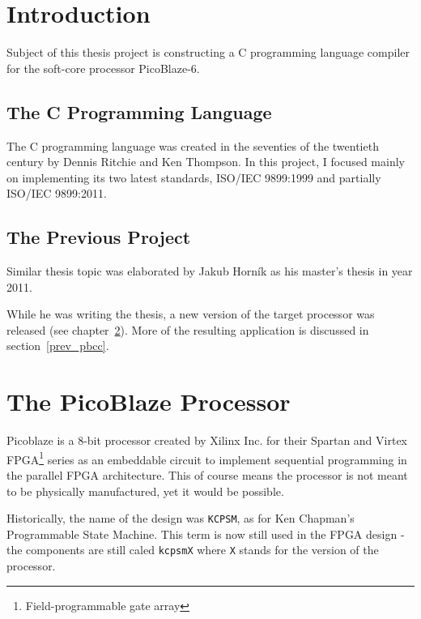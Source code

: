 
\chapter{Introduction}\label{introduction}

Subject of this thesis project is constructing a C programming language compiler for the soft-core processor PicoBlaze-6.

    \section{The C Programming Language}


    The C programming language was created in the seventies %
    of the twentieth century by Dennis Ritchie and Ken Thompson. In this project, I focused mainly on implementing its two latest standards, ISO/IEC 9899:1999 and partially ISO/IEC 9899:2011.

    \section{The Previous Project}
    Similar thesis topic was elaborated by Jakub Horník as his %
    master's thesis in year 2011.

    While he was writing the thesis, a new version of the target processor was released (see chapter~\ref{processor}). More of the resulting application is discussed in section~\ref{prev_pbcc}.

\chapter{The PicoBlaze Processor}\label{processor}

Picoblaze is a 8-bit processor created by Xilinx Inc. for their Spartan and Virtex FPGA\footnote{Field-programmable gate array} series as an embeddable circuit to implement sequential programming in the parallel FPGA architecture. This of course means the processor is not meant to be physically manufactured, yet it would be possible.

Historically, the name of the design was \texttt{KCPSM}, as for Ken Chapman's Programmable State Machine. This term is now still used in the FPGA design - the components are still caled \texttt{kcpsmX} where \texttt{X} stands for the version of the processor.

